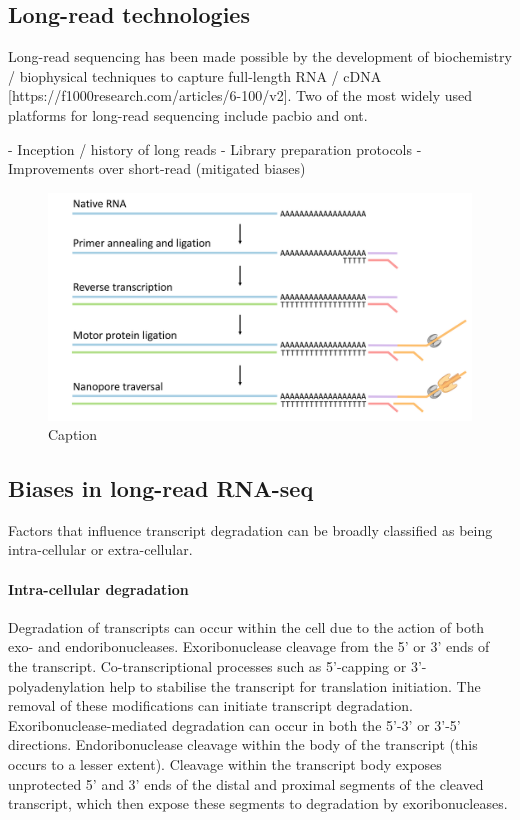 \subsection{Long-read technologies}

Long-read sequencing has been made possible by the development of biochemistry / biophysical techniques to capture full-length RNA / cDNA [https://f1000research.com/articles/6-100/v2]. Two of the most widely used platforms for long-read sequencing include \gls{pacbio} and \gls{ont}.    

- Inception / history of long reads
- Library preparation protocols
- Improvements over short-read (mitigated biases)

\begin{figure}[H]
    \centering
    \includegraphics[width=\textwidth]{figures/sec-1-drna.png}
    \caption{Caption}
    \label{fig:my_label}
\end{figure}

\subsection{Biases in long-read RNA-seq}


Factors that influence transcript degradation can be broadly classified as being intra-cellular or extra-cellular. 

\paragraph{Intra-cellular degradation} Degradation of transcripts can occur within the cell due to the action of both exo- and endoribonucleases. Exoribonuclease cleavage from the 5’ or 3’ ends of the transcript. Co-transcriptional processes such as 5’-capping or 3’-polyadenylation help to stabilise the transcript for translation initiation. The removal of these modifications can initiate transcript degradation. Exoribonuclease-mediated degradation can occur in both the 5’-3’ or 3’-5’ directions. Endoribonuclease cleavage within the body of the transcript (this occurs to a lesser extent). Cleavage within the transcript body exposes unprotected 5’ and 3’ ends of the distal and proximal segments of the cleaved transcript, which then expose these segments to degradation by exoribonucleases. 

